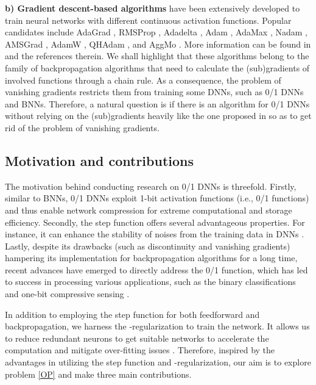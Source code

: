 \documentclass[journal]{IEEEtran}
\begin{document}
 {\bf b) Gradient descent-based algorithms} have been extensively developed to train neural networks with different continuous activation functions. Popular candidates include  AdaGrad \cite{Duchi2011}, RMSProp \cite{Tieleman2012}, Adadelta \cite{Zeiler2012}, Adam \cite{Kingma2014}, AdaMax \cite{Kingma2014}, Nadam \cite{Dozat2016}, AMSGrad \cite{Reddi2018}, AdamW \cite{Loshchilov2019}, QHAdam \cite{Ma2019},  and AggMo \cite{Lucas2019}. More information  can be found in \cite{Ruder2016} and the references therein. We shall highlight that these algorithms belong to the family of backpropagation algorithms that need to calculate the (sub)gradients of involved functions through a chain rule. As a consequence, the problem of vanishing gradients restricts them from training some DNNs, such as 0/1 DNNs and BNNs. Therefore,  a natural question is if there is an algorithm for 0/1 DNNs without relying on the (sub)gradients heavily like the one proposed in \cite{Taylor2016} so as to get rid of the problem of vanishing gradients.


\subsection{Motivation and contributions}
{
The motivation behind conducting research on 0/1 DNNs is threefold.  Firstly,  similar to BNNs, 0/1 DNNs exploit 1-bit activation functions (i.e., 0/1 functions) and thus enable  network compression for extreme computational and storage efficiency.  Secondly,  the step function offers several advantageous properties. For instance, it can enhance the stability of noises from the training data in DNNs \cite{Courbariaux2015, Courbariaux2016, Yuan2021}. Lastly, despite its drawbacks (such as discontinuity and vanishing gradients) hampering its implementation for backpropagation algorithms for a long time, recent advances have emerged to directly address the 0/1 function, which has led to success in processing various applications, such as the binary classifications \cite{Wang2021, Zhou2021} and one-bit compressive sensing \cite{Zhou12022}. }

{
In addition to employing the step function for both feedforward and backpropagation, we harness the -regularization to train the network. It allows us to reduce redundant neurons to get suitable networks to accelerate the computation and mitigate over-fitting issues \cite{lin2019, Yang2019, Dinh2020, Zhang2021, Hoefler2021}. Therefore, inspired by the advantages in utilizing the step function and -regularization, our aim is to explore problem \eqref{OP} and make three main contributions.}
 
\end{document}
